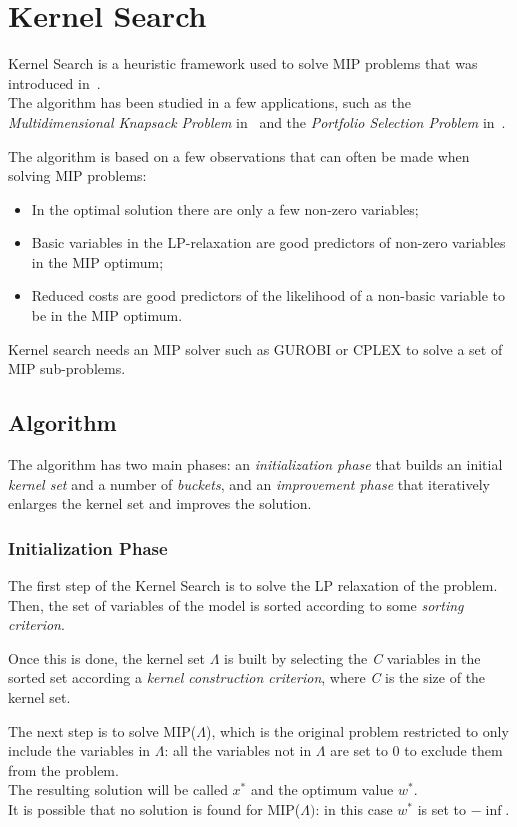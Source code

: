 \chapter{Kernel Search}\label{ch:kernel-search}
Kernel Search is a heuristic framework used to solve MIP problems that was introduced in~\cite{kernel:2007}.\\
The algorithm has been studied in a few applications, such as the \textit{Multidimensional Knapsack Problem}
in~\cite{kernel:2010} and the \textit{Portfolio Selection Problem} in~\cite{kernel:2012}.

The algorithm is based on a few observations that can often be made when solving MIP problems:
\begin{itemize}
    \item In the optimal solution there are only a few non-zero variables;
    \item Basic variables in the LP-relaxation are good predictors of non-zero variables in the MIP optimum;
    \item Reduced costs are good predictors of the likelihood of a non-basic variable to be in the MIP optimum.
\end{itemize}

Kernel search needs an MIP solver such as GUROBI or CPLEX to solve a set of MIP sub-problems.


\section{Algorithm}
The algorithm has two main phases: an \textit{initialization phase}
that builds an initial \textit{kernel set} and a number of \textit{buckets},
and an \textit{improvement phase} that iteratively enlarges the kernel set and improves the solution.

\subsection{Initialization Phase}
The first step of the Kernel Search is to solve the LP relaxation of the problem.\\
Then, the set of variables of the model is sorted according to some \textit{sorting criterion}.

Once this is done, the kernel set \(\Lambda\) is built by selecting the \textit{C}
variables in the sorted set according a \textit{kernel construction criterion},
where \textit{C} is the size of the kernel set.

The next step is to solve MIP(\(\Lambda\)),
which is the original problem restricted to only include the variables in \(\Lambda\):
all the variables not in \(\Lambda\) are set to 0 to exclude them from the problem.\\
The resulting solution will be called \(x^{*}\) and the optimum value \(w^{*}\).\\
It is possible that no solution is found for MIP(\(\Lambda)\): in this case \(w^{*}\) is set to \(-\inf\).

